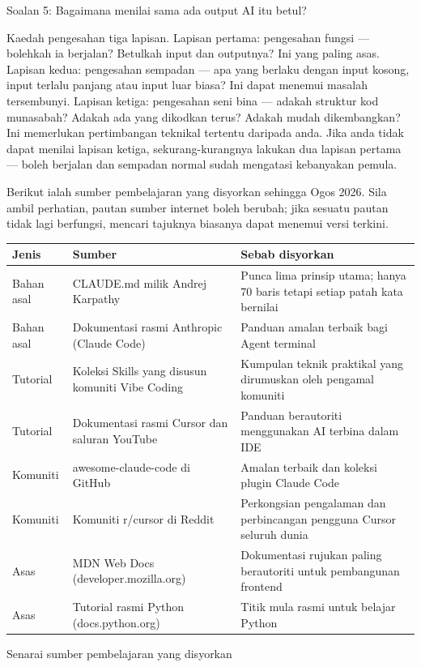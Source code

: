 Soalan 5: Bagaimana menilai sama ada output AI itu betul?

Kaedah pengesahan tiga lapisan. Lapisan pertama: pengesahan fungsi — bolehkah ia berjalan? Betulkah input dan outputnya? Ini yang paling asas. Lapisan kedua: pengesahan sempadan — apa yang berlaku dengan input kosong, input terlalu panjang atau input luar biasa? Ini dapat menemui masalah tersembunyi. Lapisan ketiga: pengesahan seni bina — adakah struktur kod munasabah? Adakah ada yang dikodkan terus? Adakah mudah dikembangkan? Ini memerlukan pertimbangan teknikal tertentu daripada anda. Jika anda tidak dapat menilai lapisan ketiga, sekurang-kurangnya lakukan dua lapisan pertama — boleh berjalan dan sempadan normal sudah mengatasi kebanyakan pemula.


Berikut ialah sumber pembelajaran yang disyorkan sehingga Ogos 2026. Sila ambil perhatian, pautan sumber internet boleh berubah; jika sesuatu pautan tidak lagi berfungsi, mencari tajuknya biasanya dapat menemui versi terkini.

\begin{center}
\begin{tabularx}{\linewidth}{|X|X|X|}
\hline
\textbf{Jenis} & \textbf{Sumber} & \textbf{Sebab disyorkan} \tabularnewline
\hline
Bahan asal & CLAUDE.md milik Andrej Karpathy & Punca lima prinsip utama; hanya 70 baris tetapi setiap patah kata bernilai \tabularnewline
Bahan asal & Dokumentasi rasmi Anthropic (Claude Code) & Panduan amalan terbaik bagi Agent terminal \tabularnewline
Tutorial & Koleksi Skills yang disusun komuniti Vibe Coding & Kumpulan teknik praktikal yang dirumuskan oleh pengamal komuniti \tabularnewline
Tutorial & Dokumentasi rasmi Cursor dan saluran YouTube & Panduan berautoriti menggunakan AI terbina dalam IDE \tabularnewline
Komuniti & awesome-claude-code di GitHub & Amalan terbaik dan koleksi plugin Claude Code \tabularnewline
Komuniti & Komuniti r/cursor di Reddit & Perkongsian pengalaman dan perbincangan pengguna Cursor seluruh dunia \tabularnewline
Asas & MDN Web Docs (developer.mozilla.org) & Dokumentasi rujukan paling berautoriti untuk pembangunan frontend \tabularnewline
Asas & Tutorial rasmi Python (docs.python.org) & Titik mula rasmi untuk belajar Python \tabularnewline
\hline
\end{tabularx}
\end{center}

\begin{center}\small\color{gray}Senarai sumber pembelajaran yang disyorkan\end{center}

